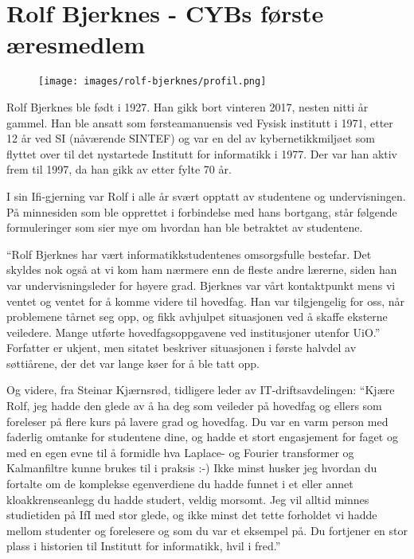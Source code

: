 \chapter[Rolf Bjerknes]{Rolf Bjerknes - CYBs første æresmedlem}

\author{Skrevet av Narve Trædal}

\begin{figure}
	\texttt{[image: images/rolf-bjerknes/profil.png]}
	\label{fig:rolf-bjerknes}
\end{figure}

Rolf Bjerknes ble født i 1927. Han gikk bort vinteren 2017, nesten nitti år gammel. Han ble ansatt som førsteamanuensis ved Fysisk institutt i 1971, etter 12 år ved SI (nåværende SINTEF) og var en del av kybernetikkmiljøet som flyttet over til det nystartede Institutt for informatikk i 1977. Der var han
aktiv frem til 1997, da han gikk av etter fylte 70 år.

I sin Ifi-gjerning var Rolf i alle år svært opptatt av studentene og undervisningen. På minnesiden som ble opprettet i forbindelse med hans bortgang, står følgende formuleringer som sier mye om hvordan han ble betraktet av studentene.

``Rolf Bjerknes har vært informatikkstudentenes omsorgsfulle bestefar. Det skyldes nok også at vi kom ham nærmere enn de fleste andre lærerne, siden han var undervisningsleder for høyere grad. Bjerknes var vårt kontaktpunkt mens vi ventet og ventet for å komme videre til hovedfag. Han var tilgjengelig for oss, når problemene tårnet seg opp, og fikk avhjulpet situasjonen ved å skaffe eksterne veiledere. Mange utførte hovedfagsoppgavene ved institusjoner utenfor UiO.'' Forfatter er ukjent, men sitatet beskriver situasjonen i første halvdel av søttiårene, der det var lange køer for å ble tatt opp.

Og videre, fra Steinar Kjærnsrød, tidligere leder av IT-driftsavdelingen: ``Kjære Rolf, jeg hadde den glede av å ha deg som veileder på hovedfag og ellers som foreleser på flere kurs på lavere grad og hovedfag. Du var en varm person med faderlig omtanke for studentene dine, og hadde et stort engasjement for faget og med en egen evne til å formidle hva Laplace- og Fourier transformer og Kalmanfiltre kunne brukes til i praksis :-) Ikke minst husker jeg hvordan du fortalte om de komplekse egenverdiene du hadde funnet i et eller annet kloakkrenseanlegg du hadde studert, veldig morsomt. Jeg vil alltid minnes studietiden på IfI med stor glede, og ikke minst det tette forholdet vi hadde mellom studenter og forelesere og som du var et eksempel på. Du fortjener en stor plass i historien til Institutt for informatikk, hvil i fred.''

